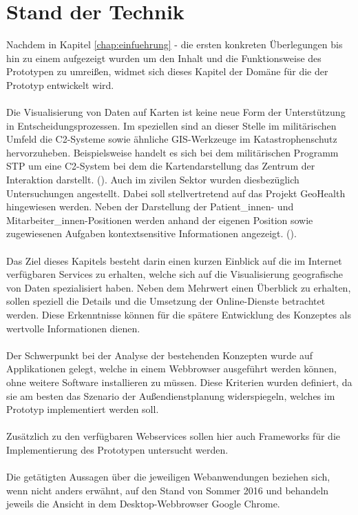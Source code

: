 \documentclass[../Bachelorarbeit.tex]{subfiles}
\begin{document}
\chapter{Stand der Technik}
\label{chap:analyse}

Nachdem in Kapitel \ref{chap:einfuehrung} -  die ersten konkreten Überlegungen bis hin zu einem  aufgezeigt wurden um den Inhalt und die Funktionsweise des Prototypen zu umreißen, widmet sich dieses Kapitel der Domäne für die der Prototyp entwickelt wird.\\
\\
Die Visualisierung von Daten auf Karten ist keine neue Form der Unterstützung in Entscheidungsprozessen. 
Im speziellen sind an dieser Stelle im militärischen Umfeld die \ac{C2}-Systeme sowie ähnliche \ac{GIS}-Werkzeuge im Katastrophenschutz hervorzuheben.
Beispielsweise handelt es sich bei dem militärischen Programm \ac{STP}  um eine \ac{C2}-System bei dem die Kartendarstellung das Zentrum der Interaktion darstellt. (\cite[vgl.][]{SketchThruPlan}). 
Auch im zivilen Sektor wurden diesbezüglich Untersuchungen angestellt. 
Dabei soll stellvertretend auf das Projekt GeoHealth hingewiesen werden.
Neben der Darstellung der Patient\_innen- und Mitarbeiter\_innen-Positionen werden anhand der eigenen Position sowie zugewiesenen Aufgaben kontextsensitive Informationen angezeigt. (\cite[vgl.][]{GeoHealth}).\\
\\
Das Ziel dieses Kapitels besteht darin einen kurzen Einblick auf die im Internet verfügbaren Services zu erhalten, welche sich auf die Visualisierung geografische von Daten spezialisiert haben. 
Neben dem Mehrwert einen Überblick  zu erhalten, sollen speziell die Details und die Umsetzung der Online-Dienste betrachtet werden.
Diese Erkenntnisse können für die spätere Entwicklung  des Konzeptes als wertvolle Informationen dienen.\\
\\
Der Schwerpunkt bei der Analyse der bestehenden Konzepten wurde auf Applikationen gelegt, welche in einem Webbrowser ausgeführt werden können, ohne weitere Software installieren zu müssen.
Diese Kriterien wurden definiert, da sie am besten das Szenario der Außendienstplanung widerspiegeln, welches im Prototyp implementiert werden soll.\\
\\
Zusätzlich zu den verfügbaren Webservices sollen hier auch Frameworks für die Implementierung des Prototypen untersucht werden. \\
\\
Die getätigten Aussagen über die jeweiligen Webanwendungen beziehen sich, wenn nicht anders erwähnt, auf den Stand von Sommer 2016 und behandeln jeweils die Ansicht in dem Desktop-Webbrowser Google Chrome.
\end{document}
